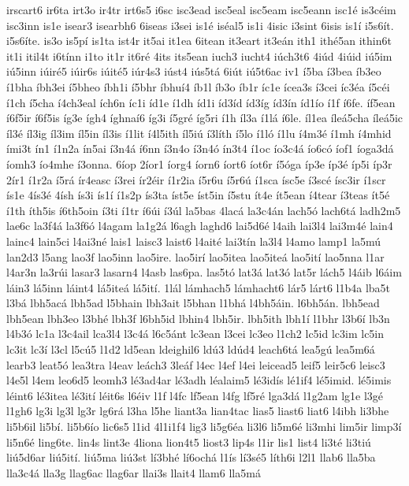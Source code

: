 {irscart6
ir6ta
irt3o
ir4tr
irt6s5
i6sc
isc3ead
isc5eal
isc5eam
isc5eann
isc1é
is3céim
isc3inn
is1e
isear3
isearbh6
6iseas
i3sei
is1é
iséal5
is1i
4isic
i3sint
6isis
is1í
i5s6ít.
i5s6íte.
is3o
is5pí
is1ta
ist4r
it5ai
it1ea
6itean
it3eart
it3eán
ith1
ithé5an
ithin6t
it1i
itil4t
i6tínn
i1to
it1r
it6ré
4its
its5ean
iuch3
iucht4
iúch3t6
4iúd
4iúid
iú5im
iú5inn
iúiré5
iúir6s
iúité5
iúr4s3
iúst4
iús5tá
6iút
iú5t6ac
iv1
í5ba
í3bea
íb3eo
í1bha
íbh3ei
í5bheo
íbh1i
í5bhr
íbhuí4
íb1l
íb3o
íb1r
íc1e
ícea3s
í3cei
íc3éa
í5céi
í1ch
í5cha
í4ch3eal
ích6n
íc1i
íd1e
í1dh
íd1i
íd3íd
íd3íg
íd3ín
íd1ío
í1f
í6fe.
íf5ean
í6f5ir
í6f5is
íg3e
ígh4
íghnaí6
íg3i
í5gré
íg5ri
í1h
íl3a
í1lá
í6le.
íl1ea
íleá5cha
íleá5ic
íl3é
íl3ig
íl3im
íl5in
íl3is
í1lit
í4l5ith
íl5iú
í3líth
í5lo
í1ló
í1lu
í4m3é
í1mh
í4mhid
ími3t
ín1
í1n2a
ín5ai
í3n4á
í6nn
í3n4o
í3n4ó
ín3t4
í1oc
ío3c4á
ío6có
íof1
íoga3dá
íomh3
ío4mhe
í3onna.
6íop
2íor1
íorg4
íorn6
íort6
íot6r
í5óga
íp3e
íp3é
íp5i
íp3r
2ír1
í1r2a
í5rá
ír4easc
í3rei
ír2éir
í1r2ia
í5r6u
í5r6ú
í1sca
ísc5e
í3scé
ísc3ir
í1scr
ís1e
4ís3é
4ísh
ís3i
ís1í
í1s2p
ís3ta
íst5e
íst5in
í5stu
ít4e
ít5ean
í4tear
í3teas
ít5é
í1th
íth5is
í6th5oin
í3ti
í1tr
í6úi
í3úl
la5bas
4lacá
la3c4án
lach5ó
lach6tá
ladh2m5
lae6c
la3f4á
la3f6ó
l4agam
la1g2á
l6agh
laghd6
lai5d6é
l4aih
lai3l4
lai3m4é
lain4
lainc4
lain5ci
l4ai3né
lais1
laisc3
laist6
l4aité
lai3tín
la3l4
l4amo
lamp1
la5mú
lan2d3
l5ang
lao3f
lao5inn
lao5ire.
lao5irí
lao5itea
lao5iteá
lao5ití
lao5nna
l1ar
l4ar3n
la3rúi
lasar3
lasarn4
l4asb
las6pa.
las5tó
lat3á
lat3ó
lat5r
lách5
l4áib
l6áim
láin3
lá5inn
láint4
lá5iteá
lá5ití.
1lál
lámhach5
lámhacht6
lár5
lárt6
l1b4a
lba5t
l3bá
lbh5acá
lbh5ad
l5bhain
lbh3ait
l5bhan
l1bhá
l4bh5áin.
l6bh5án.
lbh5ead
lbh5ean
lbh3eo
l3bhé
lbh3f
l6bh5id
lbhin4
lbh5ir.
lbh5ith
lbh1í
l1bhr
l3b6í
lb3n
l4b3ó
lc1a
l3c4ail
lca3l4
l3c4á
l6c5ánt
lc3ean
l3cei
lc3eo
l1ch2
lc5id
lc3im
lc5in
lc3it
lc3í
l3cl
l5cú5
l1d2
ld5ean
ldeighil6
ldú3
ldúd4
leach6tá
lea5gú
lea5m6á
learb3
leat5ó
lea3tra
l4eav
leách3
3leáf
l4ec
l4ef
l4ei
leicead5
leif5
leir5c6
leisc3
l4e5l
l4em
leo6d5
leomh3
lé3ad4ar
lé3adh
léalaim5
lé3idís
lé1if4
lé5imid.
lé5imis
léint6
lé3itea
lé3ití
léit6s
l6éiv
l1f
l4fc
lf5ean
l4fg
lf5ré
lga3dá
l1g2am
lg1e
l3gé
l1gh6
lg3i
lg3l
lg3r
lg6rá
l3ha
l5he
liant3a
lian4tac
lias5
liast6
liat6
l4ibh
li3bhe
li5b6il
li5bí.
li5b6ío
lic6s5
l1id
4l1i1f4
lig3
li5g6éa
li3l6
li5m6é
li3mhi
lim5ir
limp3í
li5n6é
ling6te.
lin4s
lint3e
4liona
lion4t5
liost3
lip4s
l1ir
lis1
list4
li3té
li3tiú
liú5d6ar
liú5ití.
liú5ma
liú3st
lí3bhé
lí6ochá
l1ís
lí3sé5
líth6i
l2l1
llab6
lla5ba
lla3c4á
lla3g
llag6ac
llag6ar
llai3s
llait4
llam6
lla5má
}
